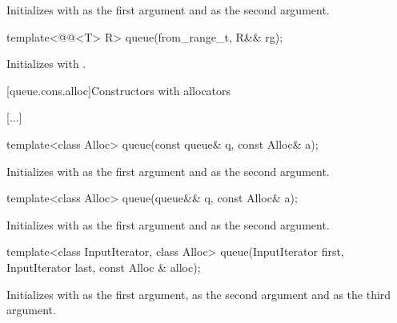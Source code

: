 \documentclass{wg21}
\begin{document}
\begin{itemdescr}
    \pnum
    \effects
    Initializes  with  as the first argument and  as the second argument.
\end{itemdescr}

\begin{addedblock}
\begin{itemdecl}
    template<@@<T> R>
    queue(from_range_t, R&& rg);
\end{itemdecl}

\begin{itemdescr}
    \pnum
    \effects
    Initializes  with .
\end{itemdescr}
\end{addedblock}

[queue.cons.alloc]{Constructors with allocators}

[...]

\begin{itemdecl}
    template<class Alloc> queue(const queue& q, const Alloc& a);
\end{itemdecl}

\begin{itemdescr}
    \pnum
    \effects
    Initializes  with  as the first argument and  as the
    second argument.
\end{itemdescr}

\begin{itemdecl}
    template<class Alloc> queue(queue&& q, const Alloc& a);
\end{itemdecl}

\begin{itemdescr}
    \pnum
    \effects
    Initializes  with  as the first argument and 
    as the second argument.
\end{itemdescr}

\begin{itemdecl}
    template<class InputIterator, class Alloc>
    queue(InputIterator first, InputIterator last, const Alloc & alloc);
\end{itemdecl}

\begin{itemdescr}
    \pnum
    \effects
    Initializes  with  as the first argument,  as the second argument and  as the third argument.
\end{itemdescr}
\end{document}
